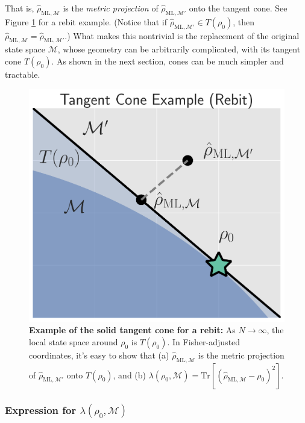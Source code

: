 \documentclass[aps,pra, twocolumn]{revtex4-1}
\newcommand{\M}{\mathcal{M}}
\newcommand{\rhohat}{\hat{\rho}}
\newcommand{\rhoML}[1]{\rhohat_{\scriptscriptstyle{\mathrm{ML},#1}}}
\begin{document}
That is, $\rhoML{\M}$ is the \emph{metric projection} of $\rhoML{\M'}$ onto the tangent cone. See Figure \ref{fig:tangentcone} for a rebit example. (Notice that if $\rhoML{\M'} \in T(\rho_{0})$, then $\rhoML{\M} = \rhoML{\M'}$.) What makes this  nontrivial is the replacement of the original state space $\M$, whose geometry can be arbitrarily complicated, with its tangent cone $T(\rho_{0})$. As shown in the next section, cones can be much simpler and tractable.

\begin{figure}
\includegraphics[width=.75\columnwidth]{Images/Figure_4.pdf}
 \caption{\textbf{Example of the solid tangent cone for a rebit:} As $N \rightarrow \infty$, the local state space around $\rho_{0}$ is $T(\rho_{0})$. In Fisher-adjusted coordinates, it's easy to show that (a) $\rhoML{\M}$ is the metric projection of $\rhoML{\M'}$ onto $T(\rho_{0})$, and (b) $\lambda(\rho_{0}, \M) = \mathrm{Tr}[(\rhoML{\M} - \rho_{0})^{2}]$.}
\label{fig:tangentcone}
\end{figure}

\subsubsection{Expression for $\lambda(\rho_{0}, \M)$}
\end{document}
